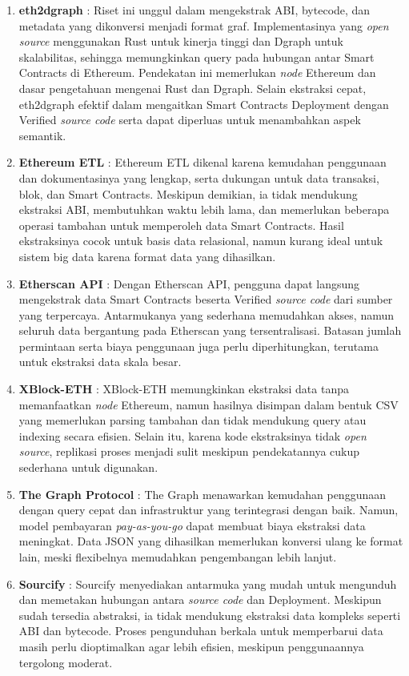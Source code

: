 \begin{enumerate}
	\item \textbf{eth2dgraph} \parencite{aimar2023extraction}: Riset ini unggul dalam mengekstrak ABI, bytecode, dan metadata yang dikonversi menjadi format graf. Implementasinya yang \textit{open source} menggunakan Rust untuk kinerja tinggi dan Dgraph untuk skalabilitas, sehingga memungkinkan query pada hubungan antar Smart Contracts di Ethereum. Pendekatan ini memerlukan \textit{node} Ethereum dan dasar pengetahuan mengenai Rust dan Dgraph. Selain ekstraksi cepat, eth2dgraph efektif dalam mengaitkan Smart Contracts Deployment dengan Verified \textit{source code} serta dapat diperluas untuk menambahkan aspek semantik.

	\item \textbf{Ethereum ETL} \parencite{ethereum_etl}: Ethereum ETL dikenal karena kemudahan penggunaan dan dokumentasinya yang lengkap, serta dukungan untuk data transaksi, blok, dan Smart Contracts. Meskipun demikian, ia tidak mendukung ekstraksi ABI, membutuhkan waktu lebih lama, dan memerlukan beberapa operasi tambahan untuk memperoleh data Smart Contracts. Hasil ekstraksinya cocok untuk basis data relasional, namun kurang ideal untuk sistem big data karena format data yang dihasilkan.

	\item \textbf{Etherscan API} \parencite{etherscan2024}: Dengan Etherscan API, pengguna dapat langsung mengekstrak data Smart Contracts beserta Verified \textit{source code} dari sumber yang terpercaya. Antarmukanya yang sederhana memudahkan akses, namun seluruh data bergantung pada Etherscan yang tersentralisasi. Batasan jumlah permintaan serta biaya penggunaan juga perlu diperhitungkan, terutama untuk ekstraksi data skala besar.

	\item \textbf{XBlock-ETH} \parencite{zheng2020xblock}: XBlock-ETH memungkinkan ekstraksi data tanpa memanfaatkan \textit{node} Ethereum, namun hasilnya disimpan dalam bentuk CSV yang memerlukan parsing tambahan dan tidak mendukung query atau indexing secara efisien. Selain itu, karena kode ekstraksinya tidak \textit{open source}, replikasi proses menjadi sulit meskipun pendekatannya cukup sederhana untuk digunakan.

	\item \textbf{The Graph Protocol} \parencite{TheGraphDocs}: The Graph menawarkan kemudahan penggunaan dengan query cepat dan infrastruktur yang terintegrasi dengan baik. Namun, model pembayaran \textit{pay-as-you-go} dapat membuat biaya ekstraksi data meningkat. Data JSON yang dihasilkan memerlukan konversi ulang ke format lain, meski flexibelnya memudahkan pengembangan lebih lanjut.

	\item \textbf{Sourcify} \parencite{sourcify_website}: Sourcify menyediakan antarmuka yang mudah untuk mengunduh dan memetakan hubungan antara \textit{source code} dan Deployment. Meskipun sudah tersedia abstraksi, ia tidak mendukung ekstraksi data kompleks seperti ABI dan bytecode. Proses pengunduhan berkala untuk memperbarui data masih perlu dioptimalkan agar lebih efisien, meskipun penggunaannya tergolong moderat.
\end{enumerate}
